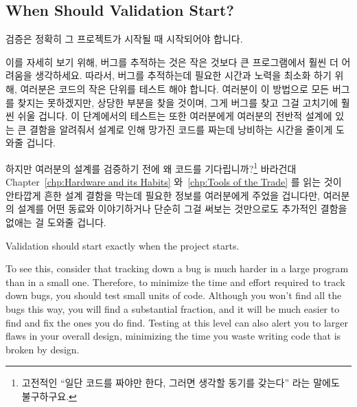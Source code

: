 \subsection{When Should Validation Start?}
\label{sec:debugging:When Should Validation Start?}

검증은 정확히 그 프로젝트가 시작될 때 시작되어야 합니다.

이를 자세히 보기 위해, 버그를 추적하는 것은 작은 것보다 큰 프로그램에서 훨씬 더
어려움을 생각하세요.
따라서, 버그를 추적하는데 필요한 시간과 노력을 최소화 하기 위해, 여러분은
코드의 작은 단위를 테스트 해야 합니다.
여러분이 이 방법으로 모든 버그를 찾지는 못하겠지만, 상당한 부분을 찾을 것이며,
그게 버그를 찾고 그걸 고치기에 훨씬 쉬울 겁니다.
이 단계에서의 테스트는 또한 여러분에게 여러분의 전반적 설계에 있는 큰 결함을
알려줘서 설계로 인해 망가진 코드를 짜는데 낭비하는 시간을 줄이게 도와줄 겁니다.

하지만 여러분의 설계를 검증하기 전에 왜 코드를 기다립니까?\footnote{
	고전적인 ``일단 코드를 짜야만 한다, 그러면 생각할 동기를 갖는다'' 라는
	말에도 불구하구요.}
바라건대 Chapter~\ref{chp:Hardware and its Habits}
와~\ref{chp:Tools of the Trade} 를 읽는 것이 안타깝게 흔한 설계 결함을 막는데
필요한 정보를 여러분에게 주었을 겁니다만, 여러분의 설계를 어떤 동료와
이야기하거나 단순히 그걸 써보는 것만으로도 추가적인 결함을 없애는 걸 도와줄
겁니다.

\iffalse

Validation should start exactly when the project starts.

To see this, consider that tracking down a bug is much harder in a large
program than in a small one.
Therefore, to minimize the time and effort required to track down bugs,
you should test small units of code.
Although you won't find all the bugs this way, you will find a substantial
fraction, and it will be much easier to find and fix the ones you do find.
Testing at this level can also alert you to larger flaws in your overall
design, minimizing the time you waste writing code that is broken
by design.

